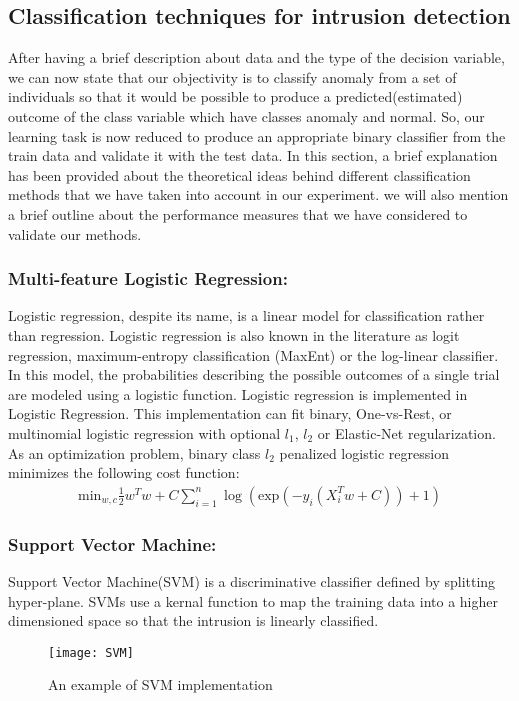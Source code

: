 \documentclass{llncs}
\begin{document}
\subsection{Classification techniques for intrusion detection }
After having a brief description about data and the type of the decision variable, we can now state that our objectivity is to classify anomaly from a set of individuals so that it would be possible to produce a predicted(estimated) outcome of the class variable which have classes anomaly and normal. So, our learning task is now reduced to produce an appropriate binary classifier from the train data and validate it with the test data\cite{osti_950976}. In this section, a brief explanation has been provided about the theoretical ideas behind different classification methods that we have taken into account in our experiment. we will also mention a brief outline about the performance measures that we have considered to validate our methods.
\subsubsection{Multi-feature Logistic Regression:}
Logistic regression, despite its name, is a linear model for classification rather than regression. Logistic regression is also known in the literature as logit regression, maximum-entropy classification (MaxEnt) or the log-linear classifier. In this model, the probabilities describing the possible outcomes of a single trial are modeled using a logistic function. Logistic regression is implemented in Logistic Regression. This implementation can fit binary, One-vs-Rest, or multinomial logistic regression with optional $l_1$, $l_2$
or Elastic-Net regularization\cite{log_reg1}\cite{log_reg2}.
As an optimization problem, binary class
$l_2$ penalized logistic regression minimizes the following cost function:
\vspace{-0.2cm}
\begin{align*}
\text{min}_{w,c} \frac{1}{2} w^{T}w + C\sum_{i=1}^{n}\log(\text{exp}(-y_i(X_i^Tw+C))+1)
\end{align*}
\vspace{-0.8cm}
\subsubsection{Support Vector Machine:}
 Support Vector Machine(SVM) is a discriminative classifier defined by splitting hyper-plane. SVMs use a kernal function to map the training data into a higher dimensioned space so that the intrusion is linearly classified\cite{CHEN20052617}.
 \begin{figure}
 \centering
 \vspace{-0.5cm}
  \texttt{[image: SVM]}
  \caption{An example of SVM implementation\cite{article1}}
 \end{figure}
\end{document}
